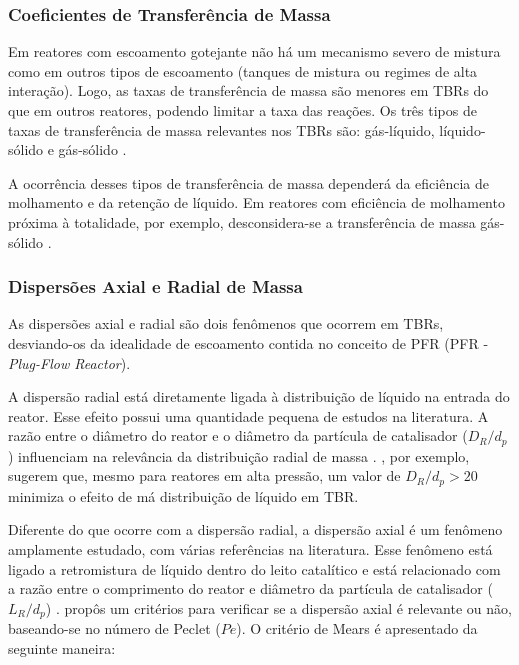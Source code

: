 
\subsubsection{Coeficientes de Transferência de Massa}
\label{sec:coeficientes}

Em reatores com escoamento gotejante não há um mecanismo severo de mistura como
em outros tipos de escoamento (tanques de mistura ou regimes de alta interação).
Logo, as taxas de transferência de massa são menores em TBRs do que em outros
reatores, podendo limitar a taxa das reações. Os três tipos de taxas de
transferência de massa relevantes nos TBRs são: gás-líquido, líquido-sólido e
gás-sólido \cite{Ranade2011}.

A ocorrência desses tipos de transferência de massa dependerá da eficiência de
molhamento e da retenção de líquido. Em reatores com eficiência de molhamento
próxima à totalidade, por exemplo, desconsidera-se a transferência de massa
gás-sólido \cite{Ranade2011}.

\subsubsection{Dispersões Axial e Radial de Massa}
\label{sec:dispersoes}

As dispersões axial e radial são dois fenômenos que ocorrem em TBRs,
desviando-os da idealidade de escoamento contida no conceito de PFR (PFR -
\emph{Plug-Flow Reactor}).


A dispersão radial está diretamente ligada à distribuição de líquido na entrada
do reator. Esse efeito possui uma quantidade pequena de estudos na literatura. A
razão entre o diâmetro do reator e o diâmetro da partícula de catalisador
($D_R/d_p$) influenciam na relevância da distribuição radial de massa
\cite{Saroha1998}. , por exemplo, sugerem que, mesmo
para reatores em alta pressão, um valor de $D_R/d_p > 20$ minimiza o efeito de
má distribuição de líquido em TBR.

Diferente do que ocorre com a dispersão radial, a dispersão axial é um fenômeno
amplamente estudado, com várias referências na literatura. Esse fenômeno está
ligado a retromistura de líquido dentro do leito catalítico e está relacionado
com a razão entre o comprimento do reator e diâmetro da partícula de catalisador
($L_R/d_p$) \cite{Ancheyta2011}. \cite{Mears1971b} propôs um critérios para
verificar se a dispersão axial é relevante ou não, baseando-se no número de
Peclet ($Pe$). O critério de Mears é apresentado da seguinte maneira:

